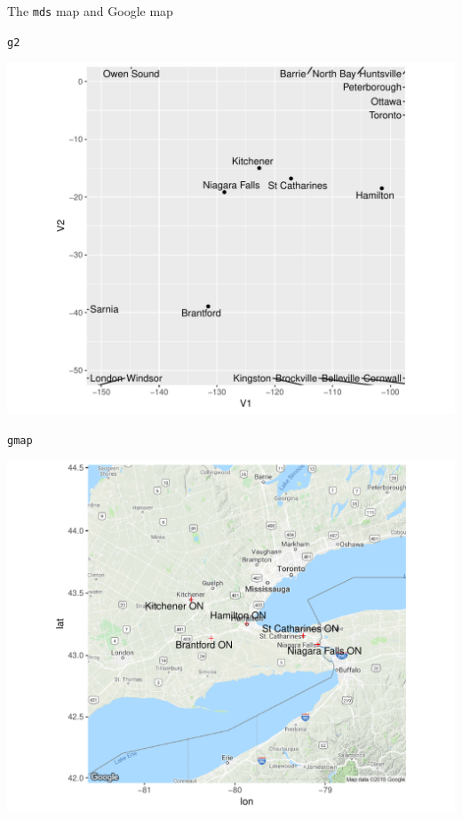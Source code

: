 \documentclass[unknownkeysallowed]{beamer}\usepackage[]{graphicx}\usepackage[]{color}
\makeatletter
\def\maxwidth{ %
  \ifdim\Gin@nat@width>\linewidth
    \linewidth
  \else
    \Gin@nat@width
  \fi
}
\newcommand{\hlstd}[1]{\textcolor[rgb]{0.345,0.345,0.345}{#1}}%
\newenvironment{kframe}{%
 \def\at@end@of@kframe{}%
 \ifinner\ifhmode%
  \def\at@end@of@kframe{\end{minipage}}%
  \begin{minipage}{\columnwidth}%
 \fi\fi%
 \def\FrameCommand##1{\hskip\@totalleftmargin \hskip-\fboxsep
 \colorbox{shadecolor}{##1}\hskip-\fboxsep
     \hskip-\linewidth \hskip-\@totalleftmargin \hskip\columnwidth}%
 \MakeFramed {\advance\hsize-\width
   \@totalleftmargin\z@ \linewidth\hsize
   \@setminipage}}%
 {\par\unskip\endMakeFramed%
 \at@end@of@kframe}
\newenvironment{knitrout}{}{} %
\makeatother
\begin{document}
\begin{frame}[frame]{The \texttt{mds} map and Google map}
  
  \begin{multicols}{2}
    
\begin{knitrout}
\color{fgcolor}\begin{kframe}
\begin{alltt}
\hlstd{g2}
\end{alltt}
\end{kframe}
\includegraphics[width=\maxwidth]{figure/unnamed-chunk-414-1} 

\end{knitrout}

\begin{knitrout}
\color{fgcolor}\begin{kframe}
\begin{alltt}
\hlstd{gmap}
\end{alltt}
\end{kframe}
\includegraphics[width=\maxwidth]{figure/unnamed-chunk-415-1} 


\end{knitrout}
\end{multicols}
\end{frame}
\end{document}
